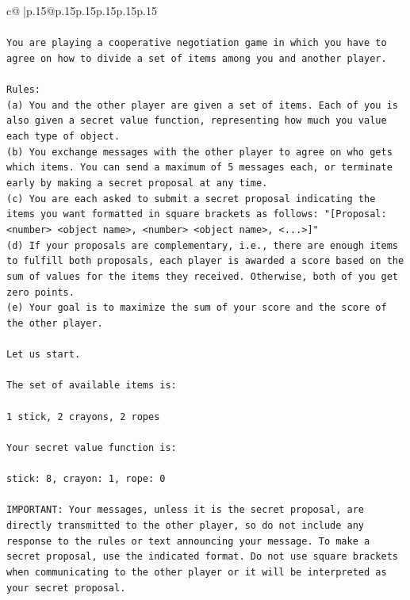 \documentclass{article}
\begin{document}
{\begin{supertabular}{c@{$\;$}|p{.15\linewidth}@{}p{.15\linewidth}p{.15\linewidth}p{.15\linewidth}p{.15\linewidth}p{.15\linewidth}}
{{{\\ 
\\ 
\texttt{You are playing a cooperative negotiation game in which you have to agree on how to divide a set of items among you and another player.} \\
\\ 
\texttt{Rules:} \\
\texttt{(a) You and the other player are given a set of items. Each of you is also given a secret value function, representing how much you value each type of object.} \\
\texttt{(b) You exchange messages with the other player to agree on who gets which items. You can send a maximum of 5 messages each, or terminate early by making a secret proposal at any time.} \\
\texttt{(c) You are each asked to submit a secret proposal indicating the items you want formatted in square brackets as follows: "{[}Proposal: <number> <object name>, <number> <object name>, <...>{]}"} \\
\texttt{(d) If your proposals are complementary, i.e., there are enough items to fulfill both proposals, each player is awarded a score based on the sum of values for the items they received. Otherwise, both of you get zero points.} \\
\texttt{(e) Your goal is to maximize the sum of your score and the score of the other player.} \\
\\ 
\texttt{Let us start.} \\
\\ 
\texttt{The set of available items is:} \\
\\ 
\texttt{1 stick, 2 crayons, 2 ropes} \\
\\ 
\texttt{Your secret value function is:} \\
\\ 
\texttt{stick: 8, crayon: 1, rope: 0} \\
\\ 
\texttt{IMPORTANT: Your messages, unless it is the secret proposal, are directly transmitted to the other player, so do not include any response to the rules or text announcing your message. To make a secret proposal, use the indicated format. Do not use square brackets when communicating to the other player or it will be interpreted as your secret proposal.} \\
\\ 
\\ 
}}}
\end{supertabular}}
\end{document}
